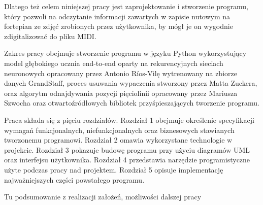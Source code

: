 \documentclass[xodstep]{wnspt}
\begin{document}
Dlatego też celem niniejszej pracy jest zaprojektowanie i stworzenie programu, który pozwoli na odczytanie informacji zawartych w zapisie nutowym na fortepian ze zdjęć zrobionych przez użytkownika, by mógł je on wygodnie zdigitalizować do pliku MIDI. 

Zakres pracy obejmuje stworzenie programu w języku Python wykorzystujący model głębokiego ucznia end-to-end oparty na rekurencyjnych sieciach neuronowych opracowany przez Antonio Ríos-Vilę wytrenowany na zbiorze danych GrandStaff\cite{Rios-Vila2023}, proces usuwania wypaczenia stworzony przez Matta Zuckera, oraz algorytm odnajdywania pozycji pięciolinii opracowany przez Mariusza Szwocha \cite{Szwoch2005} oraz otwartoźródłowych bibliotek przyśpieszających tworzenie programu.

Praca składa się z pięciu rozdziałów. Rozdział 1 obejmuje określenie specyfikacji wymagań funkcjonalnych, niefunkcjonalnych oraz biznesowych stawianych tworzonemu programowi. Rozdział 2 omawia wykorzystane technologie w projekcie. Rozdział 3 pokazuje budowę programu przy użyciu diagramów UML oraz interfejsu użytkownika. Rozdział 4 przedstawia narzędzie programistyczne użyte podczas pracy nad projektem. Rozdział 5 opisuje implementację najważniejszych części powstałego programu.








\summary
Tu podsumowanie z realizacji założeń, możliwości dalszej pracy




\listoftables

\listoffigures

\lstlistoflistings
\end{document}
